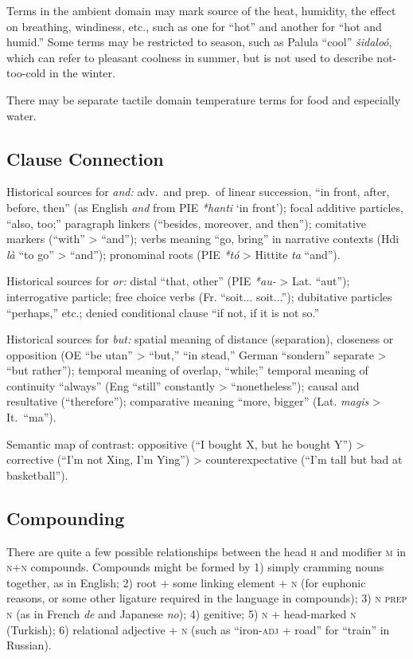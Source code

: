 \documentclass[11pt]{article}
\newcommand{\E}[1]{\textit{#1}}   %
\newcommand{\I}[1]{\textsc{#1}}   %
\begin{document}
Terms in the ambient domain may mark source of the heat, humidity, the
effect on breathing, windiness, etc., such as one for ``hot'' and
another for ``hot and humid.''  Some terms may be restricted to
season, such as Palula ``cool'' \textit{šidaloó}, which can refer to
pleasant coolness in summer, but is not used to describe not-too-cold
in the winter.

There may be separate tactile domain temperature terms for food and
especially water.

\subsection{Clause Connection}
Historical sources for \textit{and:} adv.\ and prep.\ of linear
succession, ``in front, after, before, then'' (as English \textit{and}
from PIE \textit{*hanti} `in front'); focal additive particles, ``also,
too;'' paragraph linkers (``besides, moreover, and then''); comitative
markers (``with'' > ``and''); verbs meaning ``go, bring'' in narrative
contexts (Hdi \textit{là} ``to go'' > ``and''); pronominal roots (PIE
\textit{*tó} > Hittite \textit{ta} ``and'').

Historical sources for \textit{or:} distal ``that, other'' (PIE
\textit{*au-} > Lat. ``aut''); interrogative particle; free choice
verbs (Fr. ``soit... soit...''); dubitative particles ``perhaps,''
etc.; denied conditional clause ``if not, if it is not so.''

Historical sources for \textit{but:} spatial meaning of distance
(separation), closeness or opposition (OE ``be utan'' > ``but,'' ``in
stead,'' German ``sondern'' separate > ``but rather''); temporal
meaning of overlap, ``while;'' temporal meaning of continuity
``always'' (Eng ``still'' constantly > ``nonetheless''); causal and
resultative (``therefore''); comparative meaning ``more, bigger''
(Lat. \textit{magis} > It.\ ``ma'').

Semantic map of contrast: oppositive (``I bought X, but he bought Y'')
> corrective (``I'm not Xing, I'm Ying'') > counterexpectative (``I'm
tall but bad at basketball'').

\subsection{Compounding}
There are quite a few possible relationships between the head \I{h}
and modifier \I{m} in \I{n+n} compounds.  Compounds might be formed by
1) simply cramming nouns together, as in English; 2) root + some
linking element + \I{n} (for euphonic reasons, or some other ligature
required in the language in compounds); 3) \I{n prep n} (as in French
\E{de} and Japanese \E{no}); 4) genitive; 5) \I{n} + head-marked \I{n}
(Turkish); 6) relational adjective + \I{n} (such as ``iron-\I{adj} +
road'' for ``train'' in Russian).
\end{document}
